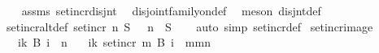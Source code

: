 \begin{isabellebody}
%
\isadelimproof
\ \ %
\endisadelimproof
%
\isatagproof
{}\isamarkupfalse%
\ assms\ set{\isacharunderscore}{\kern0pt}incr{\isacharunderscore}{\kern0pt}disjnt\ \isamarkupfalse%
\ disjoint{\isacharunderscore}{\kern0pt}family{\isacharunderscore}{\kern0pt}on{\isacharunderscore}{\kern0pt}def\ \isamarkupfalse%
\ {\isacharparenleft}{\kern0pt}meson\ disjnt{\isacharunderscore}{\kern0pt}def{\isacharparenright}{\kern0pt}%
\endisatagproof
{\isafoldproof}%
%
\isadelimproof
\isanewline
%
\endisadelimproof
\isanewline
{}\isamarkupfalse%
\ set{\isacharunderscore}{\kern0pt}incr{\isacharunderscore}{\kern0pt}altdef{\isacharcolon}{\kern0pt}\ {\isachardoublequoteopen}set{\isacharunderscore}{\kern0pt}incr\ n\ S\ {\isacharequal}{\kern0pt}\ {\isacharparenleft}{\kern0pt}{\isacharplus}{\kern0pt}{\isacharparenright}{\kern0pt}\ n\ {\isacharbackquote}{\kern0pt}\ S{\isachardoublequoteclose}\isanewline
%
\isadelimproof
\ \ %
\endisadelimproof
%
\isatagproof
{}\isamarkupfalse%
\ {\isacharparenleft}{\kern0pt}auto\ simp{\isacharcolon}{\kern0pt}\ set{\isacharunderscore}{\kern0pt}incr{\isacharunderscore}{\kern0pt}def{\isacharparenright}{\kern0pt}%
\endisatagproof
{\isafoldproof}%
%
\isadelimproof
\isanewline
%
\endisadelimproof
\isanewline
{}\isamarkupfalse%
\ set{\isacharunderscore}{\kern0pt}incr{\isacharunderscore}{\kern0pt}image{\isacharcolon}{\kern0pt}\isanewline
\ \ \ {\isachardoublequoteopen}{\isacharparenleft}{\kern0pt}{\isasymUnion}i{\isasymin}{\isacharbraceleft}{\kern0pt}{\isachardot}{\kern0pt}{\isachardot}{\kern0pt}k{\isacharbraceright}{\kern0pt}{\isachardot}{\kern0pt}\ B\ i{\isacharparenright}{\kern0pt}\ {\isacharequal}{\kern0pt}\ {\isacharbraceleft}{\kern0pt}{\isachardot}{\kern0pt}{\isachardot}{\kern0pt}{\isacharless}{\kern0pt}n{\isacharbraceright}{\kern0pt}{\isachardoublequoteclose}\isanewline
\ \ \ {\isachardoublequoteopen}{\isacharparenleft}{\kern0pt}{\isasymUnion}i{\isasymin}{\isacharbraceleft}{\kern0pt}{\isachardot}{\kern0pt}{\isachardot}{\kern0pt}k{\isacharbraceright}{\kern0pt}{\isachardot}{\kern0pt}\ set{\isacharunderscore}{\kern0pt}incr\ m\ {\isacharparenleft}{\kern0pt}B\ i{\isacharparenright}{\kern0pt}{\isacharparenright}{\kern0pt}\ {\isacharequal}{\kern0pt}\ {\isacharbraceleft}{\kern0pt}m{\isachardot}{\kern0pt}{\isachardot}{\kern0pt}{\isacharless}{\kern0pt}m{\isacharplus}{\kern0pt}n{\isacharbraceright}{\kern0pt}{\isachardoublequoteclose}\isanewline
%
\isadelimproof
\ \ %
\endisadelimproof
%
\isatagproof
{}\isamarkupfalse%

\end{isabellebody}
